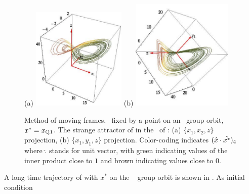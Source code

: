 %
\begin{figure}[ht]
\begin{center}
(a) \includegraphics[width=0.40\textwidth]{../figs/CLEpcSect}
(b) \includegraphics[width=0.43\textwidth]{../figs/CLEpcSect2}
\end{center}
\caption{
Method of moving frames, \slice\ fixed by a point on an
\reqv\ group orbit, $x^{*} = x_{\mathrm{Q}_{}1}$. The strange
attractor of  in the \reducedsp\
of :
(a) $\{x_1,x_2,z\}$ projection,
(b) $\{x_1,y_1,z\}$ projection.
Color-coding indicates $(\hat{x} \cdot \hat{x^{*}})_4$
where $\hat{.}$ stands for unit vector, with green indicating values
of the inner product close to $1$ and brown indicating values
close to $0$.
    }
\label{fig:CLEpcSect}
\end{figure}
%
A long time trajectory of  with
$x^*$ on the \reqv\  group orbit is shown in
.
As initial condition
